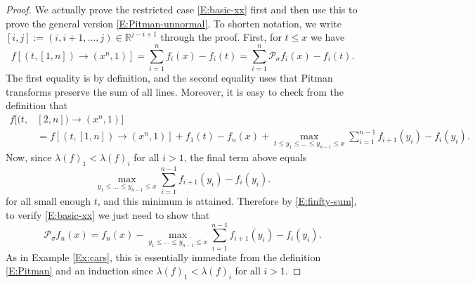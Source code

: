 \documentclass[11pt]{article}
\newcommand{\R}{\mathbb{R}}
\newcommand{\sig}{\sigma}
\newcommand{\la}{\lambda}
\newcommand{\cP}{\mathcal{P}}
\theoremstyle{definition} %
\theoremstyle{remark} %
\begin{document}
\begin{proof}
We actually prove the restricted case \eqref{E:basic-xx} first and then use this to prove the general version \eqref{E:Pitman-unnormal}.
To shorten notation, we write $[i, j] := (i, i+1, \dots, j) \in \R^{j-i + 1}$ through the proof. First, for $t \le x$ we have
\begin{equation}
	\label{E:finfty-sum}
f[(t, [1, n])\to (x^n,1)]= \sum_{i=1}^n f_i(x) - f_i(t) = \sum_{i=1}^n \cP_\sig f_i(x) - f_i(t).
\end{equation}
The first equality is by definition, and the second equality uses that Pitman transforms preserve the sum of all lines. Moreover, it is easy to check from the definition that
\begin{align*}
f[(t,& [2, n])\to (x^n,1)] \\
&= f[(t, [1, n])\to (x^n,1)] +f_1(t) - f_n(x)  + \max_{t \le y_1 \le \dots \le y_{n-1} \le x} \sum_{i=1}^{n-1} f_{i + 1}(y_i) - f_{i}(y_i).
\end{align*}
Now, since $\la(f)_1 < \la(f)_i$ for all $i > 1$, the final term above equals
$$
\max_{y_1 \le \dots \le y_{n-1} \le x} \sum_{i=1}^{n-1} f_{i + 1}(y_i) - f_{i}(y_i).
$$
for all small enough $t$, and this minimum is attained. Therefore by \eqref{E:finfty-sum}, to verify \eqref{E:basic-xx} we just need to show that
\begin{equation}
	\label{E:P-sigma}
\cP_\sig f_n(x) = f_n(x) - \max_{y_1 \le \dots \le y_{n-1} \le x} \sum_{i=1}^{n-1} f_{i + 1}(y_i) - f_{i}(y_i).
\end{equation}
As in Example \ref{Ex:cars}, this is essentially immediate from the definition \eqref{E:Pitman} and an induction since $\la(f)_1 < \la(f)_i$ for all $i > 1$. 


\end{proof}
\end{document}
